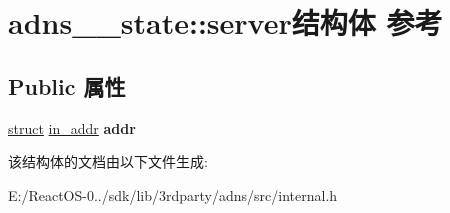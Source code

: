 \hypertarget{structadns____state_1_1server}{}\section{adns\+\_\+\+\_\+state\+:\+:server结构体 参考}
\label{structadns____state_1_1server}
\subsection*{Public 属性}
\begin{DoxyCompactItemize}
\item 
\mbox{\label{structadns____state_1_1server_a02cebb9b92c7f9b251edb86b432f18c2}} 
\hyperlink{interfacestruct}{struct} \hyperlink{structin__addr}{in\+\_\+addr} {\bfseries addr}
\end{DoxyCompactItemize}


该结构体的文档由以下文件生成\+:\begin{DoxyCompactItemize}
\item 
E\+:/\+React\+O\+S-\/0../sdk/lib/3rdparty/adns/src/internal.\+h\end{DoxyCompactItemize}
